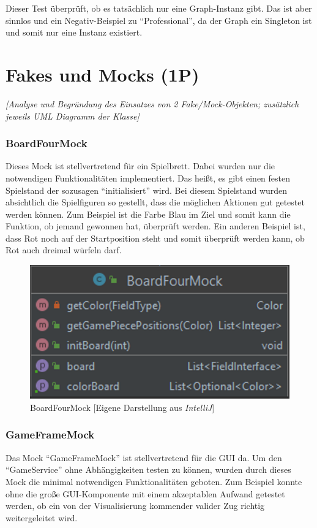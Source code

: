 \noindent Dieser Test überprüft, ob es tatsächlich nur eine Graph-Instanz gibt. Das ist aber sinnlos und ein Negativ-Beispiel zu \enquote{Professional}, da der Graph ein Singleton ist und somit nur eine Instanz existiert. 

\section{Fakes und Mocks (1P)}
\emph{[Analyse und Begründung des Einsatzes von 2 Fake/Mock-Objekten; zusätzlich jeweils UML
Diagramm der Klasse]}

\subsubsection{BoardFourMock}
\noindent Dieses Mock ist stellvertretend für ein Spielbrett. Dabei wurden nur die notwendigen Funktionalitäten implementiert. Das heißt, es gibt einen festen Spielstand der sozusagen \enquote{initialisiert} wird. Bei diesem Spielstand wurden absichtlich die Spielfiguren so gestellt, dass die möglichen Aktionen gut getestet werden können. Zum Beispiel ist die Farbe Blau im Ziel und somit kann die Funktion, ob jemand gewonnen hat, überprüft werden. Ein anderen Beispiel ist, dass Rot noch auf der Startposition steht und somit überprüft werden kann, ob Rot auch dreimal würfeln darf.

\begin{figure}[htbp]
\centering
\centerline{\includegraphics[scale=.5]{boardfourmock}}
\caption{BoardFourMock [Eigene Darstellung aus \emph{IntelliJ}]}
\label{fig:boardfourmock}
\end{figure}


\newpage
\subsubsection{GameFrameMock}
\noindent Das Mock \enquote{GameFrameMock} ist stellvertretend für die GUI da. Um den \enquote{GameService} ohne Abhängigkeiten testen zu können, wurden durch dieses Mock die minimal notwendigen Funktionalitäten geboten. Zum Beispiel konnte ohne die große GUI-Komponente mit einem akzeptablen Aufwand getestet werden, ob ein von der Visualisierung kommender valider Zug richtig weitergeleitet wird.


